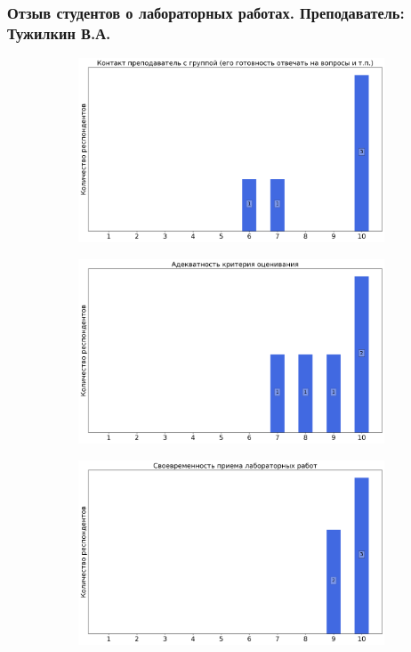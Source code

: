     \subsubsection{Отзыв студентов о лабораторных работах. Преподаватель: Тужилкин В.А.}
		\begin{figure}[H]
			\centering
			\begin{subfigure}[b]{0.45\textwidth}
				\centering
				\includegraphics[width=\textwidth]{images/3 course/Аналоговая электроника/labniks-marks-Тужилкин В.А.-0.png}
			\end{subfigure}
			\begin{subfigure}[b]{0.45\textwidth}
				\centering
				\includegraphics[width=\textwidth]{images/3 course/Аналоговая электроника/labniks-marks-Тужилкин В.А.-1.png}
			\end{subfigure}
			\begin{subfigure}[b]{0.45\textwidth}
				\centering
				\includegraphics[width=\textwidth]{images/3 course/Аналоговая электроника/labniks-marks-Тужилкин В.А.-2.png}

\end{subfigure}
\end{figure}
